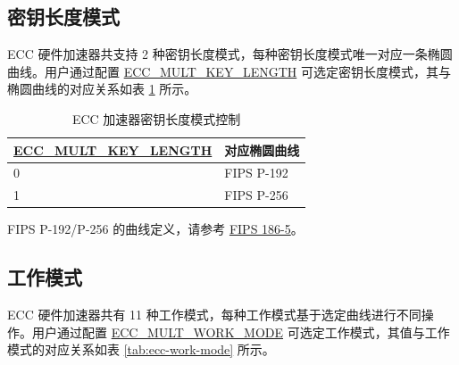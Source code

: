 \documentclass[main\_\_CN.tex]{subfiles}
\begin{document}
\subsection{密钥长度模式}

\chipname{} ECC 硬件加速器共支持 2 种密钥长度模式，每种密钥长度模式唯一对应一条椭圆曲线。用户通过配置 \hyperref[fielddesc:ECCMULTKEYLENGTH]{ECC\_MULT\_KEY\_LENGTH} 可选定密钥长度模式，其与椭圆曲线的对应关系如表 \ref{tab:ecc-key-length} 所示。


\begin{table}[H]
    \centering
    \caption{ECC 加速器密钥长度模式控制}
    \label{tab:ecc-key-length}
    \begin{threeparttable}
    \begin{tabular}{|p{4.2cm}|p{3.6cm}|}
    \hline
        \rowcolor{lightgray}
        \textbf{\hyperref[fielddesc:ECCMULTKEYLENGTH]{ECC\_MULT\_KEY\_LENGTH}} & \textbf{对应椭圆曲线\tnote{*}} \\ \hline
        0 & FIPS P-192  \\\hline
        1 & FIPS P-256  \\\hline
    \end{tabular}
    \begin{tablenotes}
        \item[*] FIPS P-192/P-256 的曲线定义，请参考 \href{https://nvlpubs.nist.gov/nistpubs/FIPS/NIST.FIPS.186-5.pdf}{FIPS 186-5}。
    \end{tablenotes}
    \end{threeparttable}
\end{table}

\subsection{工作模式}
\label{sec:ecc-work-mode}

\chipname{} ECC 硬件加速器共有 11 种工作模式，每种工作模式基于选定曲线进行不同操作。用户通过配置 \hyperref[fielddesc:ECCMULTWORKMODE]{ECC\_MULT\_WORK\_MODE} 可选定工作模式，其值与工作模式的对应关系如表 \ref{tab:ecc-work-mode} 所示。
\end{document}
